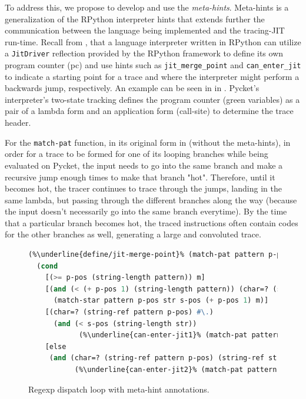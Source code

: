 To address this, we propose to develop and use the
\emph{meta-hints}. Meta-hints is a generalization of the RPython
interpreter hints that extends further the communication between the
language being implemented and the tracing-JIT run-time. Recall from
, that a language interpreter written in
RPython can utilize a \verb|JitDriver| reflection provided by the
RPython framework to define its own program counter (pc) and use hints
such as \verb|jit_merge_point| and \verb|can_enter_jit| to indicate a
starting point for a trace and where the interpreter might perform a
backwards jump, respectively. An example can be seen in
 in . Pycket's
interpreter's two-state tracking defines the program counter (green
variables) as a pair of a lambda form and an application form
(call-site) to determine the trace header.

For the \verb|match-pat| function, in its original form in
 (without the meta-hints), in order for a trace to
be formed for one of its looping branches while being evaluated on
Pycket, the input needs to go into the same branch and make a
recursive jump enough times to make that branch "hot". Therefore,
until it becomes hot, the tracer continues to trace through the jumps,
landing in the same lambda, but passing through the different branches
along the way (because the input doesn't necessarily go into the same
branch everytime). By the time that a particular branch becomes hot,
the traced instructions often contain codes for the other branches as
well, generating a large and convoluted trace.

\begin{figure}[h!]
  \footnotesize
  \begin{mdframed}
\begin{lstlisting}[mathescape,escapechar=\%,language=lisp]
(%\underline{define/jit-merge-point}% (match-pat pattern p-pos str s-pos m) %\underline{\#:greens pattern}%
  (cond
    [(>= p-pos (string-length pattern)) m]
    [(and (< (+ p-pos 1) (string-length pattern)) (char=? (string-ref pattern (+ p-pos 1)) #\*))
      (match-star pattern p-pos str s-pos (+ p-pos 1) m)]
    [(char=? (string-ref pattern p-pos) #\.)
      (and (< s-pos (string-length str))
            (%\underline{can-enter-jit1}% (match-pat pattern (add1 p-pos) str (add1 s-pos) (cons (string-ref str s-pos) m))))]
    [else
     (and (char=? (string-ref pattern p-pos) (string-ref str s-pos))
           (%\underline{can-enter-jit2}% (match-pat pattern (add1 p-pos) str (add1 s-pos) (cons (string-ref str s-pos) m))))]))
\end{lstlisting}
\end{mdframed}
\caption{Regexp dispatch loop with meta-hint annotations.}
\label{fig:annotated-regexp}
\end{figure}

